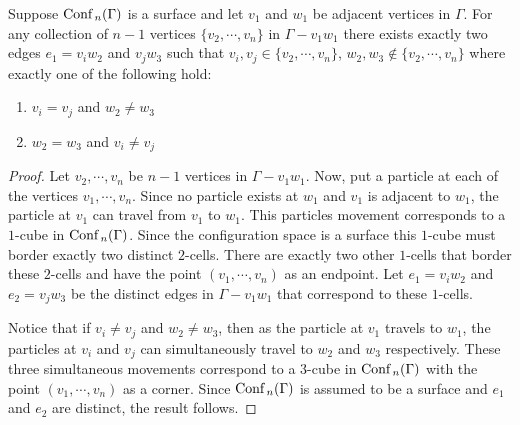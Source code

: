 \begin{lem}
    \label{lem:is_surface_1}
    Suppose \(\text{Conf}\,_n(\Gamma)\) is a surface and let \(v_1\) and \(w_1\) be adjacent vertices in \(\Gamma\).
    For any collection of \(n-1\) vertices \(\{v_2, \cdots, v_n\}\) in \(\Gamma - v_1 w_1\) there exists exactly two edges \(e_1 = v_i w_2\) and \(v_j w_3\)
    such that \(v_i, v_j \in \{v_2, \cdots, v_n\}\), \(w_2, w_3 \not \in \{v_2, \cdots, v_n\}\) where exactly one of the following hold:
    \begin{enumerate}
        \item \(v_i = v_j\) and \(w_2 \neq w_3\)
        \item \(w_2 = w_3\) and \(v_i \neq v_j\)
    \end{enumerate}
\end{lem}
\begin{proof}
    Let \(v_2, \cdots, v_n\) be \(n-1\) vertices in \(\Gamma - v_1 w_1\).   
    Now, put a particle at each of the vertices \(v_1, \cdots, v_n\).
    Since no particle exists at \(w_1\) and \(v_1\) is adjacent to \(w_1\), 
    the particle at \(v_1\) can travel from \(v_1\) to \(w_1\).
    This particles movement corresponds to a \(1\)-cube in \(\text{Conf}\,_n(\Gamma)\).
    Since the configuration space is a surface this \(1\)-cube must border exactly two distinct \(2\)-cells.
    There are exactly two other \(1\)-cells that border these \(2\)-cells and have the point \((v_1, \cdots, v_n)\) as an endpoint. 
    Let \(e_1 = v_i w_2\) and \(e_2 = v_j w_3\) be the distinct edges in \(\Gamma - v_1 w_1\) that correspond to these \(1\)-cells.
    
    Notice that if \(v_i \neq v_j\) and \(w_2 \neq w_3\), then as the particle at \(v_1\) travels to \(w_1\), the particles
    at \(v_i\) and \(v_j\) can simultaneously travel to \(w_2\) and \(w_3\) respectively. These three simultaneous movements correspond
    to a \(3\)-cube in \(\text{Conf}\,_n(\Gamma)\) with the point \((v_1, \cdots, v_n)\) as a corner.
    Since \(\text{Conf}\,_n(\Gamma)\) is assumed to be a surface and \(e_1\) and \(e_2\) are distinct, 
    the result follows.
\end{proof}

